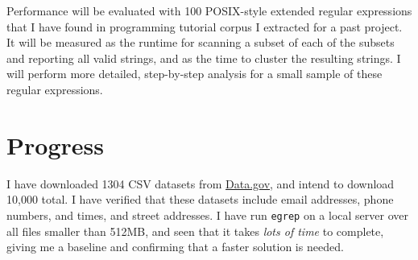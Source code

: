 \documentclass[10pt]{article}
\begin{document}
Performance will be evaluated with 100 POSIX-style extended regular expressions that I have found in programming tutorial corpus I extracted for a past project.
It will be measured as the runtime for scanning a subset of each of the subsets and reporting all valid strings, and as the time to cluster the resulting strings.
I will perform more detailed, step-by-step analysis for a small sample of these regular expressions.

\section{Progress}

I have downloaded 1304 CSV datasets from \url{Data.gov}, and intend to download 10,000 total.
I have verified that these datasets include email addresses, phone numbers, and times, and street addresses.
I have run \texttt{egrep} on a local server over all files smaller than 512MB, and seen that it takes \emph{lots of time} to complete, giving me a baseline and confirming that a faster solution is needed.

\printbibliography{}
\end{document}
